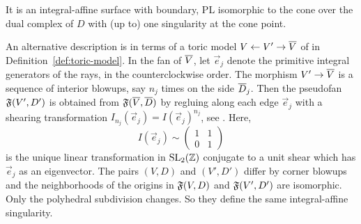 \documentclass{amsart}
\begin{document}
It is an integral-affine surface with boundary,
PL isomorphic to the cone over the dual complex of $D$ with (up to)
one singularity at the cone point.
%
%
%
%
%
%
%
%

An alternative description is in terms of a toric model
$V\gets V'\to {\overline V}$ of in Definition~\ref{def:toric-model}. In the fan
of ${\overline V}$, let $\vec e_{j}$ denote the primitive integral generators of the rays, in
the counterclockwise order. The morphism $V'\to{\overline V}$ is a sequence of
interior blowups, say $n_{j}$ times on the side ${\overline D}_{j}$. Then the
pseudofan ${\mathfrak F}(V',D')$ is obtained from ${\mathfrak F}({\overline V},{\overline D})$ by regluing
along each edge $\vec e_{j}$ with a shearing transformation
$I_{n_j}(\vec e_j) = I(\vec e_j)^{n_j}$, see \cite[Prop.~3.13]{engel2018looijenga}.
Here, $$I(\vec e_j)\sim \begin{pmatrix} 1&1\\0&1 \end{pmatrix}$$
is the unique linear transformation in $\operatorname{SL}_2({\mathbb Z})$ conjugate to a unit shear
which has $\vec e_j$ as an eigenvector.
The pairs $(V,D)$ and $(V',D')$ differ by corner blowups and the
neighborhoods of the origins in ${\mathfrak F}(V,D)$ and ${\mathfrak F}(V',D')$ are
isomorphic. Only the polyhedral subdivision changes.
So they define the same integral-affine singularity.
\end{document}
